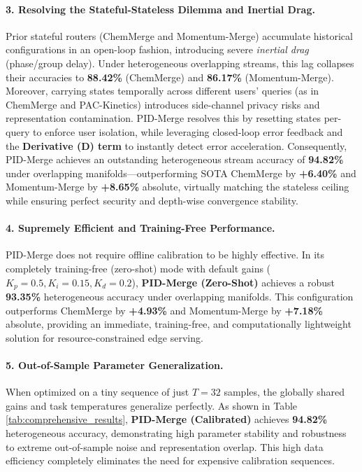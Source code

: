\paragraph{3. Resolving the Stateful-Stateless Dilemma and Inertial Drag.}
Prior stateful routers (ChemMerge and Momentum-Merge) accumulate historical configurations in an open-loop fashion, introducing severe \emph{inertial drag} (phase/group delay). Under heterogeneous overlapping streams, this lag collapses their accuracies to \textbf{88.42\%} (ChemMerge) and \textbf{86.17\%} (Momentum-Merge). Moreover, carrying states temporally across different users' queries (as in ChemMerge and PAC-Kinetics) introduces side-channel privacy risks and representation contamination. PID-Merge resolves this by resetting states per-query to enforce user isolation, while leveraging closed-loop error feedback and the \textbf{Derivative (D) term} to instantly detect error acceleration. Consequently, PID-Merge achieves an outstanding heterogeneous stream accuracy of \textbf{94.82\%} under overlapping manifolds—outperforming SOTA ChemMerge by \textbf{+6.40\%} and Momentum-Merge by \textbf{+8.65\%} absolute, virtually matching the stateless ceiling while ensuring perfect security and depth-wise convergence stability.

\paragraph{4. Supremely Efficient and Training-Free Performance.}
PID-Merge does not require offline calibration to be highly effective. In its completely training-free (zero-shot) mode with default gains ($K_p = 0.5, K_i = 0.15, K_d = 0.2$), \textbf{PID-Merge (Zero-Shot)} achieves a robust \textbf{93.35\%} heterogeneous accuracy under overlapping manifolds. This configuration outperforms ChemMerge by \textbf{+4.93\%} and Momentum-Merge by \textbf{+7.18\%} absolute, providing an immediate, training-free, and computationally lightweight solution for resource-constrained edge serving.

\paragraph{5. Out-of-Sample Parameter Generalization.}
When optimized on a tiny sequence of just $T = 32$ samples, the globally shared gains and task temperatures generalize perfectly. As shown in Table \ref{tab:comprehensive_results}, \textbf{PID-Merge (Calibrated)} achieves \textbf{94.82\%} heterogeneous accuracy, demonstrating high parameter stability and robustness to extreme out-of-sample noise and representation overlap. This high data efficiency completely eliminates the need for expensive calibration sequences.

